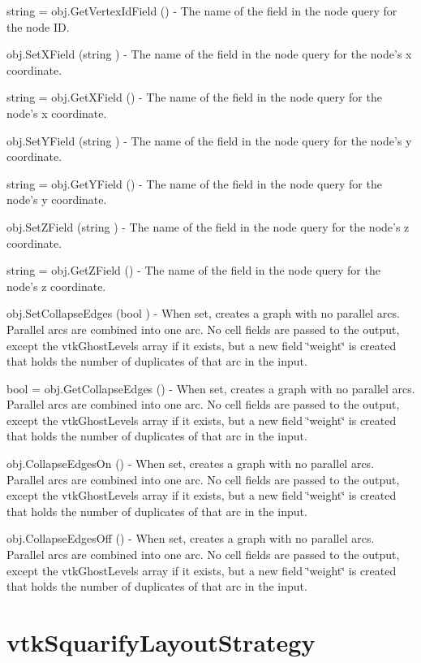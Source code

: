 \begin{DoxyItemize}
\item {\ttfamily string = obj.\-Get\-Vertex\-Id\-Field ()} -\/ The name of the field in the node query for the node I\-D.  
\item {\ttfamily obj.\-Set\-X\-Field (string )} -\/ The name of the field in the node query for the node's x coordinate.  
\item {\ttfamily string = obj.\-Get\-X\-Field ()} -\/ The name of the field in the node query for the node's x coordinate.  
\item {\ttfamily obj.\-Set\-Y\-Field (string )} -\/ The name of the field in the node query for the node's y coordinate.  
\item {\ttfamily string = obj.\-Get\-Y\-Field ()} -\/ The name of the field in the node query for the node's y coordinate.  
\item {\ttfamily obj.\-Set\-Z\-Field (string )} -\/ The name of the field in the node query for the node's z coordinate.  
\item {\ttfamily string = obj.\-Get\-Z\-Field ()} -\/ The name of the field in the node query for the node's z coordinate.  
\item {\ttfamily obj.\-Set\-Collapse\-Edges (bool )} -\/ When set, creates a graph with no parallel arcs. Parallel arcs are combined into one arc. No cell fields are passed to the output, except the vtk\-Ghost\-Levels array if it exists, but a new field \char`\"{}weight\char`\"{} is created that holds the number of duplicates of that arc in the input.  
\item {\ttfamily bool = obj.\-Get\-Collapse\-Edges ()} -\/ When set, creates a graph with no parallel arcs. Parallel arcs are combined into one arc. No cell fields are passed to the output, except the vtk\-Ghost\-Levels array if it exists, but a new field \char`\"{}weight\char`\"{} is created that holds the number of duplicates of that arc in the input.  
\item {\ttfamily obj.\-Collapse\-Edges\-On ()} -\/ When set, creates a graph with no parallel arcs. Parallel arcs are combined into one arc. No cell fields are passed to the output, except the vtk\-Ghost\-Levels array if it exists, but a new field \char`\"{}weight\char`\"{} is created that holds the number of duplicates of that arc in the input.  
\item {\ttfamily obj.\-Collapse\-Edges\-Off ()} -\/ When set, creates a graph with no parallel arcs. Parallel arcs are combined into one arc. No cell fields are passed to the output, except the vtk\-Ghost\-Levels array if it exists, but a new field \char`\"{}weight\char`\"{} is created that holds the number of duplicates of that arc in the input.  
\end{DoxyItemize}\hypertarget{vtkinfovis_vtksquarifylayoutstrategy}{}\section{vtk\-Squarify\-Layout\-Strategy}\label{vtkinfovis_vtksquarifylayoutstrategy}
